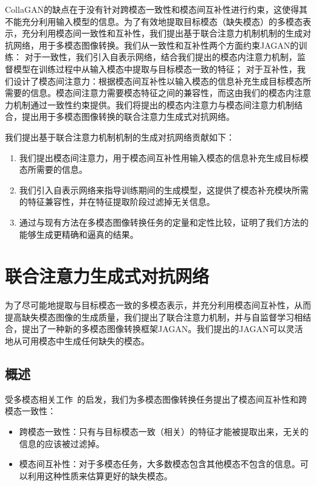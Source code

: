 CollaGAN的缺点在于没有针对跨模态一致性和模态间互补性进行约束，这使得其不能充分利用输入模型的信息。为了有效地提取目标模态（缺失模态）的多模态表示，充分利用模态间一致性和互补性，我们提出基于联合注意力机制机制的生成对抗网络，用于多模态图像转换。我们从一致性和互补性两个方面约束JAGAN的训练：
对于一致性，我们引入自表示网络，结合我们提出的模态内注意力机制，监督模型在训练过程中从输入模态中提取与目标模态一致的特征；
对于互补性，我们设计了模态间注意力：根据模态间互补性以输入模态的信息补充生成目标模态所需要的信息。模态间注意力需要模态特征之间的兼容性，而这由我们的模态内注意力机制通过一致性约束提供。我们将提出的模态内注意力与模态间注意力机制结合，提出用于多模态图像转换的联合注意力生成式对抗网络。


我们提出基于联合注意力机制机制的生成对抗网络贡献如下：

\begin{enumerate}
\item 我们提出模态间注意力，用于模态间互补性用输入模态的信息补充生成目标模态所需要的信息。
\item 我们引入自表示网络来指导训练期间的生成模型，这提供了模态补充模块所需的特征兼容性，并在特征提取阶段过滤掉无关信息。
\item 通过与现有方法在多模态图像转换任务的定量和定性比较，证明了我们方法的能够生成更精确和逼真的结果。
\end{enumerate}


\section{联合注意力生成式对抗网络}
为了尽可能地提取与目标模态一致的多模态表示，并充分利用模态间互补性，从而提高缺失模态图像的生成质量，我们提出了联合注意力机制，并与自监督学习相结合，提出了一种新的多模态图像转换框架JAGAN。我们提出的JAGAN可以灵活地从可用模态中生成任何缺失的模态。

\subsection{概述}

受多模态相关工作~\cite{zhang2020deep}的启发，我们为多模态图像转换任务提出了模态间互补性和跨模态一致性：
\begin{itemize}
    \item 跨模态一致性：只有与目标模态一致（相关）的特征才能被提取出来，无关的信息的应该被过滤掉。
    \item 模态间互补性：对于多模态任务，大多数模态包含其他模态不包含的信息。可以利用这种性质来估算更好的缺失模态。
\end{itemize}

